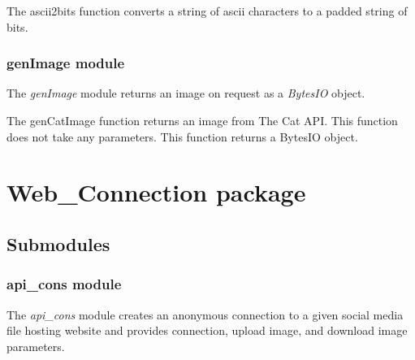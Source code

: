 \documentclass[letterpaper,10pt,english]{sphinxmanual}
\begin{document}

\begin{fulllineitems}
\label{Image_Manipulation:Image_Manipulation.lsbsteg.ascii2bits}
The ascii2bits function converts a string of ascii characters to a
padded string of bits.

\end{fulllineitems}



\subsubsection{genImage module}
\label{Image_Manipulation:genimage-module}
The \emph{genImage} module returns an image on request as a \emph{BytesIO} object.
\label{Image_Manipulation:module-Image_Manipulation.genImage}

\begin{fulllineitems}
\label{Image_Manipulation:Image_Manipulation.genImage.genCatImage}
The genCatImage function returns an image from The Cat API.
This function does not take any parameters.
This function returns a BytesIO object.

\end{fulllineitems}



\section{Web\_Connection package}
\label{Web_Connection:web-connection-package}\label{Web_Connection::doc}

\subsection{Submodules}
\label{Web_Connection:submodules}

\subsubsection{api\_cons module}
\label{Web_Connection:api-cons-module}
The \emph{api\_cons} module creates an anonymous connection to a given social media
file hosting website and provides connection, upload image, and download image
parameters.
\label{Web_Connection:module-Web_Connection.api_cons}
\end{document}
